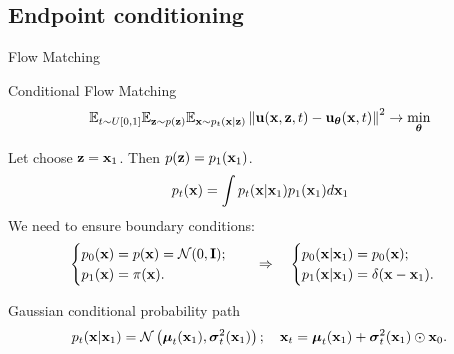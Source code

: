 \subsection{Endpoint conditioning}
\begin{frame}{Flow Matching}
	\begin{block}{Conditional Flow Matching}
		\vspace{-0.3cm}
		\[
			\mathbb{E}_{t \sim U[0, 1]} \mathbb{E}_{\mathbf{z} \sim p(\mathbf{z})} \mathbb{E}_{\mathbf{x} \sim p_t(\mathbf{x} | \mathbf{z})}\left\| \mathbf{u}(\mathbf{x}, \mathbf{z}, t) - \mathbf{u}_{\boldsymbol{\theta}}(\mathbf{x}, t) \right\|^2 \rightarrow \min_{\boldsymbol{\theta}}
		\]
		\vspace{-0.3cm}
	\end{block}
	Let choose $\mathbf{z} = \mathbf{x}_1$. Then $p(\mathbf{z}) = p_1(\mathbf{x}_1)$.
	\[
		p_t(\mathbf{x}) = \int p_t(\mathbf{x} | \mathbf{x}_1) p_1(\mathbf{x}_1) d \mathbf{x}_1
	\]
	We need to ensure boundary conditions:
	\[
		\begin{cases}
			p_0(\mathbf{x}) = p(\mathbf{x})= \mathcal{N}(0, \mathbf{I}); \\
			p_1(\mathbf{x}) = \pi(\mathbf{x}).
		\end{cases}
		\quad \Rightarrow \quad 
		\begin{cases}
			p_0(\mathbf{x} | \mathbf{x}_1) = p_0(\mathbf{x}); \\
			p_1(\mathbf{x} | \mathbf{x}_1) = \delta(\mathbf{x} - \mathbf{x}_1).
		\end{cases}
	\]
	\vspace{-0.3cm}
	\begin{block}{Gaussian conditional probability path}
		\vspace{-0.4cm}
		\[
			p_t(\mathbf{x} | \mathbf{x}_1) = \mathcal{N}\left(\boldsymbol{\mu}_t(\mathbf{x}_1), \boldsymbol{\sigma}_t^2(\mathbf{x}_1)\right); \quad \mathbf{x}_t = \boldsymbol{\mu}_t(\mathbf{x}_1) +  \boldsymbol{\sigma}_t^2(\mathbf{x}_1) \odot \mathbf{x}_0.
		\]
		\vspace{-0.6cm}
	\end{block}
\end{frame}
